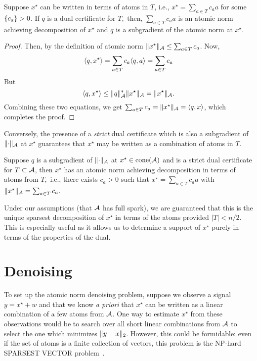 \begin{prop}
\label{prop:dual-certificate-is-subgrad}
Suppose $x^\star$ can be written in terms of atoms in $T$, i.e., $x^\star =
\sum_{a \in T} c_a a$ for some $\left\{ c_a \right\} > 0$. If $q$ is a dual certificate for
$T,$ then, $\sum_{a \in T} c_a a$ is an atomic norm achieving decomposition of
$x^\star$ and $q$ is a subgradient of the atomic norm at $x^\star.$
\end{prop}
\begin{proof}
	Then, by the definition of atomic norm $\lVert x^\star\rVert_{\mathcal{A}} \leq \sum_{a \in T} c_a$. Now, 
	\[
		\langle q, x^\star\rangle = \sum_{a \in T} c_a\langle q, a\rangle = \sum_{a \in T} c_a
	\]
	But 
	\[
		\langle q, x^\star\rangle \leq \lVert q\rVert_{\mathcal{A}}^* \lVert x^\star\rVert_{\mathcal{A}} = \lVert x^\star\rVert_{\mathcal{A}}.
	\]
	Combining these two equations, we get $\sum_{a \in T} c_a = \lVert x^\star\rVert_{\mathcal{A}} =
	\langle q, x\rangle$, which completes the proof.
\end{proof}

Conversely, the presence of a \emph{strict} dual certificate which is also a
subgradient of $\lVert\cdot\rVert_{\mathcal{A}}$ at $x^\star$ guarantees that $x^\star$ may be
written as a combination of atoms in $T.$ 

\begin{prop}\label{prop:certificate-support}
Suppose $q$ is a subgradient of $\lVert\cdot\rVert_{\mathcal{A}}$ at $x^\star \in \operatorname{cone}(\mathcal{A})$ and is a strict dual certificate for $T \subset \mathcal{A}$, then $x^\star$ has an atomic norm achieving decomposition in terms of atoms from $T,$ i.e., there exists $c_a > 0$ such that $x^\star = \sum_{a \in T}c_a a$ with $\lVert x^\star\rVert_{\mathcal{A}} = \sum_{a \in T}c_a$.
\end{prop}

Under our assumptions (that $\mathcal{A}$ has full spark), we are guaranteed that this is
the unique sparsest decomposition of $x^\star$ in terms of the atoms provided
$|T| < n/2$. This is especially useful as it allows us to determine a support of
$x^\star$ purely in terms of the properties of the dual.


\section{Denoising}
\label{sec:abstract-denoising}

To set up the atomic norm denoising problem, suppose we observe a signal $y =
x^\star + w$ and that we know \emph{a priori} that $x^\star$ can be written as a
linear combination of a few atoms from $\mathcal{A}$. One way to estimate $x^\star$ from
these observations would be to search over all short linear combinations from
$\mathcal{A}$ to select the one which minimizes $\lVert y- x\rVert_2$. However, this could be
formidable: even if the set of atoms is a finite collection of vectors, this
problem is the NP-hard SPARSEST VECTOR problem~\cite{Natarajan95}.

